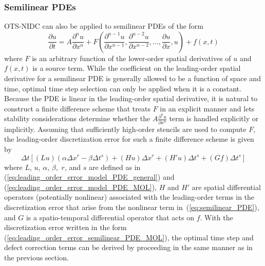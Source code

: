 \documentclass[fleqn,12pt,twoside]{article}
\newcommand{\beq}{\begin{equation}}
\newcommand{\eeq}{\end{equation}}
\def\dt{\Delta t}
\def\dx{\Delta x}
\begin{document}
\subsubsection*{Semilinear PDEs}
OTS-NIDC can also be applied to semilinear PDEs of the form
\beq
  \frac{\partial u}{\partial t} = A \frac{\partial^n u}{\partial x^n}
  + F \left( \frac{\partial^{n-1} u}{\partial x^{n-1}},
      \frac{\partial^{n-2} u}{\partial x^{n-2}}, \ldots,
      \frac{\partial u}{\partial x}, u \right)
  + f(x,t)
  \label{eq:semilinear_PDE}
\eeq
where $F$ is an arbitrary function of the lower-order spatial derivatives
of $u$ and $f(x,t)$ is a source term.  While the coefficient on the 
leading-order spatial derivative for a semilinear PDE is generally allowed 
to be a function of space and time, optimal time step selection can only be 
applied when it is a constant.  Because the PDE is linear in the leading-order 
spatial derivative, it is natural to construct a finite difference scheme that 
treats $F$ in an explicit manner and lets stability considerations determine 
whether the $A \frac{\partial^n u}{\partial x^n}$ term is handled explicitly or 
implicitly.  Assuming that sufficiently high-order stencils are used to 
compute $F$, the leading-order discretization error for such a finite 
difference scheme is given by
\beq
  \dt \left[ (L u) (\alpha \dx^r - \beta \dt^s) 
  + \left( H u \right) \dx^r 
  + \left( H' u \right) \dt^s
  + (G f) \dt^s \right]
  \label{eq:leading_order_error_semilinear_PDE_MOL}
\eeq
where $L$, $u$, $\alpha$, $\beta,$ $r$, and $s$ are defined as in
(\ref{eq:leading_order_error_model_PDE_general}) and
(\ref{eq:leading_order_error_model_PDE_MOL}), $H$ and $H'$ are spatial 
differential operators (potentially nonlinear) associated with the 
leading-order terms in the discretization error that arise from the nonlinear 
term in~(\ref{eq:semilinear_PDE}), and $G$ is a spatio-temporal differential 
operator that acts on $f$.  With the discretization error written in the 
form (\ref{eq:leading_order_error_semilinear_PDE_MOL}), the optimal time 
step and defect correction terms can be derived by proceeding in the same 
manner as in the previous section.
\end{document}
